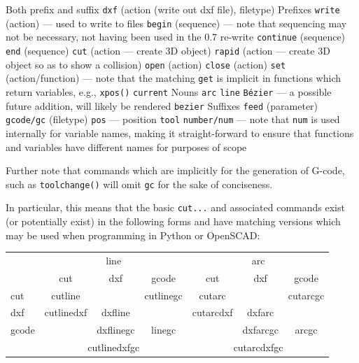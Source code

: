 \documentclass{ltxdoc}
\begin{document}
\begin{outline}
\1 Both prefix and suffix
\2 \texttt{dxf} (action (write out dxf file), filetype)
\1 Prefixes
\2 \texttt{write} (action) --- used to write to files
\2 \texttt{begin} (sequence) --- note that sequencing may not be necessary, not having been used in the 0.7 re-write
\2 \texttt{continue} (sequence)
\2 \texttt{end} (sequence)
\2 \texttt{cut} (action --- create 3D object)
\2 \texttt{rapid} (action --- create 3D object so as to show a collision)
\2 \texttt{open} (action)
\2 \texttt{close} (action)
\2 \texttt{set} (action/function) --- note that the matching \verb|get| is implicit in functions which return variables, e.g., \verb|xpos()|
\2 \texttt{current}
\1 Nouns
\2 \texttt{arc}
\2 \texttt{line}
\2 \texttt{Bézier} --- a possible future addition, will likely be rendered \verb|bezier|
\1 Suffixes
\2 \texttt{feed} (parameter)
\2 \texttt{gcode/gc} (filetype)
\2 \texttt{pos} --- position
\2 \texttt{tool}
\2 \texttt{number/num} --- note that \verb|num| is used internally for variable names, making it straight-forward to ensure that functions and variables have different names for purposes of scope
\end{outline}

\noindent Further note that commands which are implicitly for the generation of G-code, such as \verb|toolchange()| will omit \verb|gc| for the sake of conciseness.

In particular, this means that the basic \verb|cut...| and associated commands exist (or potentially exist) in the following forms and have matching versions which may be used when programming in Python or OpenSCAD:

\bigskip

\noindent\begin{tabular}{lcccccc}\toprule
& \multicolumn{3}{c}{line} & \multicolumn{3}{c}{arc}
\\\cmidrule(lr){2-4}\cmidrule(lr){5-7}
      & cut                  & dxf     & gcode        & cut                 & dxf       & gcode       \\\midrule
cut   & cutline\hphantom{dxf}&         &  cutlinegc   & cutarc\hphantom{dxf}&           & cutarcgc            \\
dxf   & cutlinedxf           & dxfline\hphantom{gc} &              & cutarcdxf           & dxfarc\hphantom{gc}    &             \\
gcode &             & dxflinegc & linegc\hphantom{cut} &                 & dxfarcgc          & arcgc\hphantom{cut} \\\cmidrule(lr){2-4}\cmidrule(lr){5-7}
& \multicolumn{3}{c}{cutlinedxfgc} & \multicolumn{3}{c}{cutarcdxfgc}\\\bottomrule
\end{tabular}
\end{document}
